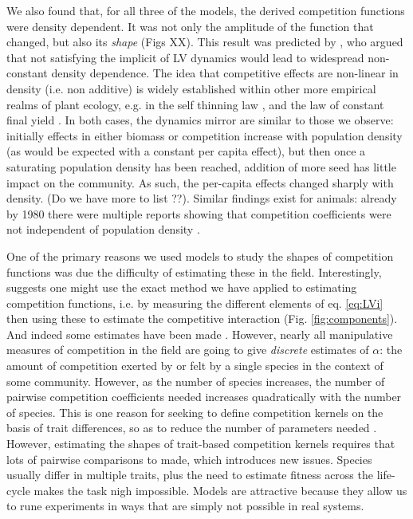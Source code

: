 \documentclass[a4paper,11pt]{article}
\begin{document}
We also found that, for all three of the models, the derived competition
functions were density dependent. It was not only the amplitude of the
function that changed, but also its \emph{shape} (Figs XX). This result was
predicted by \citet{Abrams-1980}, who argued that not satisfying the implicit
of LV dynamics would lead to widespread non-constant density dependence. The
idea that competitive effects are non-linear in density (i.e. non additive) is
widely established within other more empirical realms of plant ecology, e.g.
in the self thinning law \citep{Westoby-1984}, and the law of constant final
yield \citep{Weiner-2010}. In both cases, the dynamics mirror are similar to
those we observe: initially effects in either biomass or competition increase with population
density (as would be expected with a constant per capita effect), but then
once a saturating population density has been reached, addition of more seed
has little impact on the community. As such, the per-capita effects changed
sharply with density. (Do we have more to list ??). Similar findings
exist for animals: already by 1980 there were  multiple reports showing that
competition coefficients were not independent of population density
\citep{Abrams-1980}.

One of the primary reasons we used models to study the shapes of competition
functions was due the difficulty of estimating these in the field.
Interestingly, \citet{Ricklefs-1973} suggests one might use the exact  method
we have applied to estimating competition functions, i.e. by measuring the
different elements of eq. \ref{eq:LVi} then using these to estimate the
competitive interaction (Fig. \ref{fig:components}). And indeed some
estimates have been made \citep{Ricklefs-1973, Kraft-2015}. However, nearly all
manipulative measures of competition in the field are going to give
\emph{discrete} estimates of $\alpha$: the amount of competition exerted by
or felt by a single species in the context of some community. However, as
the number of species increases, the number of pairwise competition
coefficients needed increases quadratically with the number of species. This is
one reason for seeking to define competition kernels on the basis of
trait differences, so as to reduce the number of parameters needed \citep{Kraft-2015}.
However, estimating the shapes of trait-based competition kernels requires
that lots of pairwise comparisons to made, which introduces new issues.
Species usually differ in multiple traits, plus the need to estimate fitness
across the life-cycle makes the task nigh impossible. Models are attractive
because they allow us to rune experiments in ways that are simply not
possible in real systems. 
\end{document}
